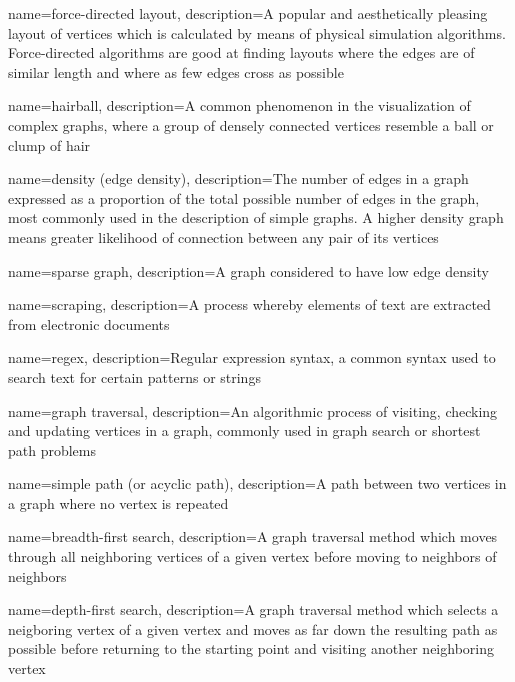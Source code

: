 {
    name={force-directed layout},
    description={A popular and aesthetically pleasing layout of vertices which is calculated by means of physical simulation algorithms.  Force-directed algorithms are good at finding layouts where the edges are of similar length and where as few edges cross as possible}
}

{
    name={hairball},
    description={A common phenomenon in the visualization of complex graphs, where a group of densely connected vertices resemble a ball or clump of hair}
}

{
    name={density (edge density)},
    description={The number of edges in a graph expressed as a proportion of the total possible number of edges in the graph, most commonly used in the description of simple graphs.  A higher density graph means greater likelihood of connection between any pair of its vertices}
}

{
    name={sparse graph},
    description={A graph considered to have low edge density}
}

{
    name={scraping},
    description={A process whereby elements of text are extracted from electronic documents}
}

{
    name={regex},
    description={Regular expression syntax, a common syntax used to search text for certain patterns or strings}
}

{
    name={graph traversal},
    description={An algorithmic process of visiting, checking and updating vertices in a graph, commonly used in graph search or shortest path problems}
}

{
    name={simple path (or acyclic path)},
    description={A path between two vertices in a graph where no vertex is repeated}
}

{
    name={breadth-first search},
    description={A graph traversal method which moves through all neighboring vertices of a given vertex before moving to neighbors of neighbors}
}

{
    name={depth-first search},
    description={A graph traversal method which selects a neigboring vertex of a given vertex and moves as far down the resulting path as possible before returning to the starting point and visiting another neighboring vertex}
}

